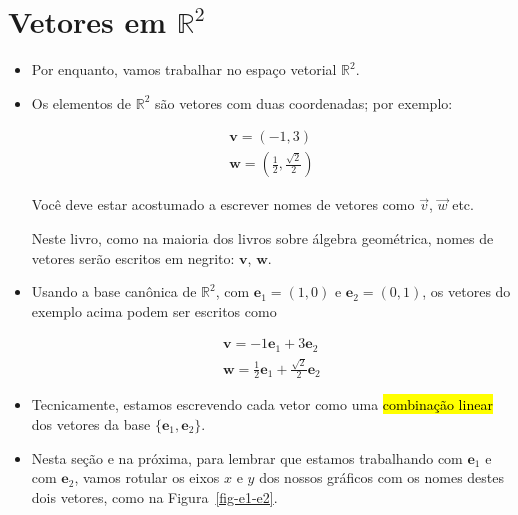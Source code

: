 \documentclass[
  letterpaper,
  DIV=11,
  numbers=noendperiod]{scrreprt}
\begin{document}
\hypertarget{sec-vetores-r2}{%
\section{\texorpdfstring{Vetores em
$\mathbb{R}^2$}{Vetores em }}\label{sec-vetores-r2}}

\begin{itemize}
\item
  Por enquanto, vamos trabalhar no espaço vetorial $\mathbb{R}^2$.
\item
  Os elementos de $\mathbb{R}^2$ são vetores com duas coordenadas; por
  exemplo:

  \[
  \begin{array}{l}
    \mathbf{v} = (-1, 3)\\
    \mathbf{w} = \left( \frac12, \frac{\sqrt{2}}{2} \right)
  \end{array}
  \]

  \begin{tcolorbox}[standard jigsaw,colbacktitle=quarto-callout-warning-color!10!white, colback=white, opacitybacktitle=0.6, colframe=quarto-callout-warning-color-frame, bottomtitle=1mm, toptitle=1mm, coltitle=black, titlerule=0mm, leftrule=.75mm, title=\textcolor{quarto-callout-warning-color}{\faExclamationTriangle}\hspace{0.5em}{Notação: vetores em negrito}, left=2mm, rightrule=.15mm, arc=.35mm, toprule=.15mm, bottomrule=.15mm, opacityback=0]
  Você deve estar acostumado a escrever nomes de vetores como $\vec v$,
  $\vec w$ etc.

  Neste livro, como na maioria dos livros sobre álgebra geométrica,
  nomes de vetores serão escritos em negrito: $\mathbf{v}$,
  $\mathbf{w}$.
  \end{tcolorbox}
\item
  Usando a base canônica de $\mathbb{R}^2$, com
  $\mathbf{e}_{1} = (1, 0)$ e $\mathbf{e}_{2} = (0, 1)$, os vetores do
  exemplo acima podem ser escritos como

  \[
  \begin{array}{l}
    \mathbf{v} = -1\mathbf{e}_{1} + 3\mathbf{e}_{2}\\
    \mathbf{w} = \frac12 \mathbf{e}_{1} + \frac{\sqrt{2}}{2}\mathbf{e}_{2}
  \end{array}
  \]
\item
  Tecnicamente, estamos escrevendo cada vetor como uma {\hl{combinação
  linear}} dos vetores da base $\{ \mathbf{e}_{1}, \mathbf{e}_{2} \}$.
\item
  Nesta seção e na próxima, para lembrar que estamos trabalhando com
  $\mathbf{e}_{1}$ e com $\mathbf{e}_{2}$, vamos rotular os eixos $x$ e
  $y$ dos nossos gráficos com os nomes destes dois vetores, como na
  Figura~\ref{fig-e1-e2}.


\end{itemize}
\end{document}
